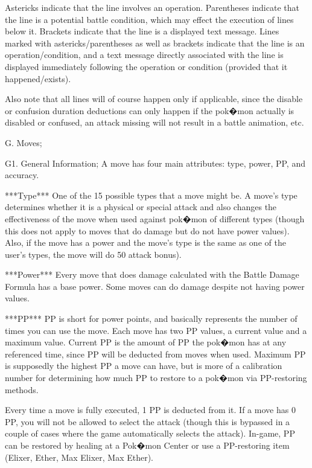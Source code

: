 \documentclass[reprint, aps, prl, paper=A4]{revtex4-1}
\begin{document}
Astericks indicate that the line involves an operation. Parentheses indicate that the line is
a potential battle condition, which may effect the execution of lines below it. Brackets
indicate that the line is a displayed text message. Lines marked with astericks/parentheses as
well as brackets indicate that the line is an operation/condition, and a text message directly
associated with the line is displayed immediately following the operation or condition
(provided that it happened/exists).

Also note that all lines will of course happen only if applicable, since the disable or
confusion duration deductions can only happen if the pok�mon actually is disabled or confused,
an attack missing will not result in a battle animation, etc.



G. Moves;

G1. General Information;
A move has four main attributes: type, power, PP, and accuracy.


***Type***
One of the 15 possible types that a move might be. A move's type determines whether it is a
physical or special attack and also changes the effectiveness of the move when used against
pok�mon of different types (though this does not apply to moves that do damage but do not have
power values). Also, if the move has a power and the move's type is the same as one of the
user's types, the move will do 50%
attack bonus).


***Power***
Every move that does damage calculated with the Battle Damage Formula has a base power. Some
moves can do damage despite not having power values.


***PP***
PP is short for power points, and basically represents the number of times you can use the
move. Each move has two PP values, a current value and a maximum value. Current PP is the
amount of PP the pok�mon has at any referenced time, since PP will be deducted from moves when
used. Maximum PP is supposedly the highest PP a move can have, but is more of a calibration
number for determining how much PP to restore to a pok�mon via PP-restoring methods.

Every time a move is fully executed, 1 PP is deducted from it. If a move has 0 PP, you will not
be allowed to select the attack (though this is bypassed in a couple of cases where the game
automatically selects the attack). In-game, PP can be restored by healing at a Pok�mon Center
or use a PP-restoring item (Elixer, Ether, Max Elixer, Max Ether).
\end{document}
